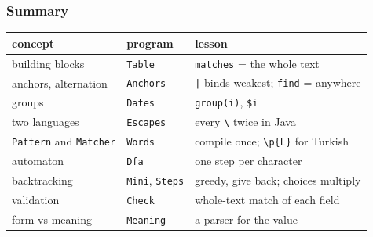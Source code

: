 \documentclass[aspectratio=169,10pt,compress]{beamer}
\begin{document}




\begin{frame}[t,fragile] \frametitle{Summary}
  \begin{center}\small
  \begin{tabular}{@{}L{0.3\textwidth}L{0.2\textwidth}L{0.42\textwidth}@{}}
    \toprule
    \textbf{concept}                    & \textbf{program}        & \textbf{lesson} \\
    \midrule
    building blocks                     & \texttt{Table}           & \texttt{matches} = the whole text \\
    anchors, alternation                & \texttt{Anchors}         & \texttt{|} binds weakest; \texttt{find} = anywhere \\
    groups                              & \texttt{Dates}           & \texttt{group(i)}, \texttt{\$i} \\
    two languages                       & \texttt{Escapes}         & every \texttt{\textbackslash} twice in Java \\
    \texttt{Pattern} and \texttt{Matcher} & \texttt{Words}         & compile once; \texttt{\textbackslash p\{L\}} for Turkish \\
    automaton                           & \texttt{Dfa}             & one step per character \\
    backtracking                        & \texttt{Mini}, \texttt{Steps} & greedy, give back; choices multiply \\
    validation                          & \texttt{Check}           & whole-text match of each field \\
    form vs meaning                     & \texttt{Meaning}         & a parser for the value \\
    \bottomrule
  \end{tabular}
  \end{center}
\end{frame}
\end{document}
